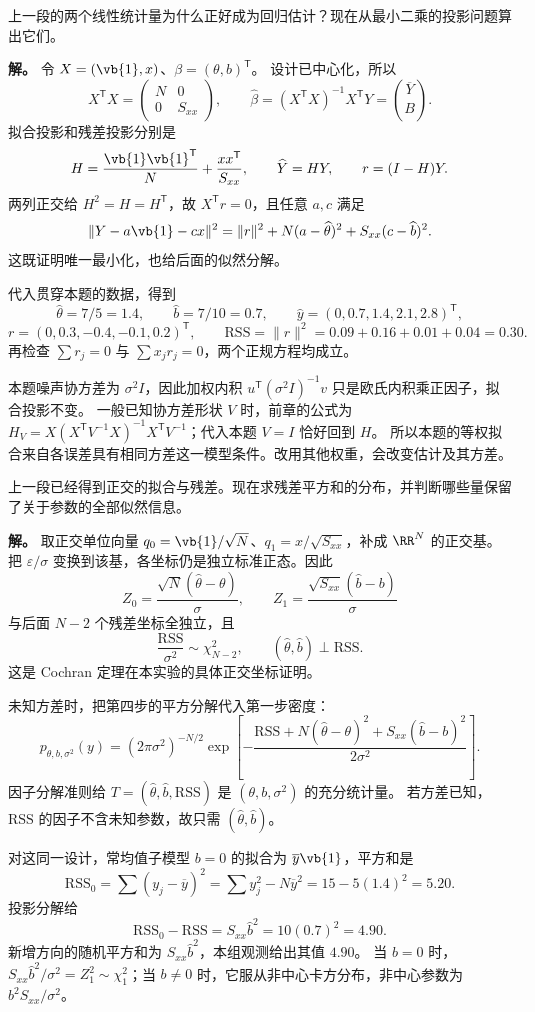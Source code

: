 \begin{exbox}
上一段的两个线性统计量为什么正好成为回归估计？现在从最小二乘的投影问题算出它们。

\textbf{解。} 令 $X=(\vb{1},x)$、$\beta=(\theta,b)^{\mathsf T}$。
设计已中心化，所以
\[
 X^{\mathsf T}X=\begin{pmatrix}N&0\\0&S_{xx}\end{pmatrix},\qquad
 \widehat\beta=(X^{\mathsf T}X)^{-1}X^{\mathsf T}Y
 =\binom{\overline Y}{B}.
\]
拟合投影和残差投影分别是
\[
 H=\frac{\vb{1}\vb{1}^{\mathsf T}}N+\frac{x x^{\mathsf T}}{S_{xx}},
 \qquad \widehat Y=HY,\qquad r=(I-H)Y.
\]
两列正交给 $H^2=H=H^{\mathsf T}$，故 $X^{\mathsf T}r=0$，且任意 $a,c$ 满足
\[
 \|Y-a\vb{1}-cx\|^2
 =\|r\|^2+N(a-\widehat\theta)^2+S_{xx}(c-\widehat b)^2.
\]
这既证明唯一最小化，也给后面的似然分解。

代入贯穿本题的数据，得到
\[
 \widehat\theta=7/5=1.4,\qquad \widehat b=7/10=0.7,
 \qquad \widehat y=(0,0.7,1.4,2.1,2.8)^{\mathsf T},
\]
\[
 r=(0,0.3,-0.4,-0.1,0.2)^{\mathsf T},\qquad
 \mathrm{RSS}=\|r\|^2=0.09+0.16+0.01+0.04=0.30.
\]
再检查 $\sum r_j=0$ 与 $\sum x_jr_j=0$，两个正规方程均成立。

本题噪声协方差为 $\sigma^2I$，因此加权内积 $u^{\mathsf T}(\sigma^2I)^{-1}v$ 只是欧氏内积乘正因子，拟合投影不变。
一般已知协方差形状 $V$ 时，前章的公式为 $H_V=X(X^{\mathsf T}V^{-1}X)^{-1}X^{\mathsf T}V^{-1}$；代入本题 $V=I$ 恰好回到 $H$。
所以本题的等权拟合来自各误差具有相同方差这一模型条件。改用其他权重，会改变估计及其方差。
\end{exbox}

\begin{exbox}
上一段已经得到正交的拟合与残差。现在求残差平方和的分布，并判断哪些量保留了关于参数的全部似然信息。

\textbf{解。} 取正交单位向量 $q_0=\vb{1}/\sqrt N$、$q_1=x/\sqrt{S_{xx}}$，补成 $\RR^N$ 的正交基。
把 $\varepsilon/\sigma$ 变换到该基，各坐标仍是独立标准正态。因此
\[
 Z_0=\frac{\sqrt N(\widehat\theta-\theta)}\sigma,
 \qquad Z_1=\frac{\sqrt{S_{xx}}(\widehat b-b)}\sigma
\]
与后面 $N-2$ 个残差坐标全独立，且
\[
 \frac{\mathrm{RSS}}{\sigma^2}\sim\chi^2_{N-2},\qquad
 (\widehat\theta,\widehat b)\perp\mathrm{RSS}.
\]
这是 Cochran 定理在本实验的具体正交坐标证明。

未知方差时，把第四步的平方分解代入第一步密度：
\[
 p_{\theta,b,\sigma^2}(y)
 =(2\pi\sigma^2)^{-N/2}
 \exp\left[-\frac{\mathrm{RSS}+N(\widehat\theta-\theta)^2
 +S_{xx}(\widehat b-b)^2}{2\sigma^2}\right].
\]
因子分解准则给 $T=(\widehat\theta,\widehat b,\mathrm{RSS})$ 是 $(\theta,b,\sigma^2)$ 的充分统计量。
若方差已知，$\mathrm{RSS}$ 的因子不含未知参数，故只需 $(\widehat\theta,\widehat b)$。

对这同一设计，常均值子模型 $b=0$ 的拟合为 $\overline y\vb{1}$，平方和是
\[
 \mathrm{RSS}_0=\sum(y_j-\overline y)^2
 =\sum y_j^2-N\overline y^2=15-5(1.4)^2=5.20.
\]
投影分解给
\[
 \mathrm{RSS}_0-\mathrm{RSS}=S_{xx}\widehat b^2=10(0.7)^2=4.90.
\]
新增方向的随机平方和为 $S_{xx}\widehat b^2$，本组观测给出其值 $4.90$。
当 $b=0$ 时，$S_{xx}\widehat b^2/\sigma^2=Z_1^2\sim\chi^2_1$；当 $b\ne0$ 时，它服从非中心卡方分布，非中心参数为 $b^2S_{xx}/\sigma^2$。
\end{exbox}

